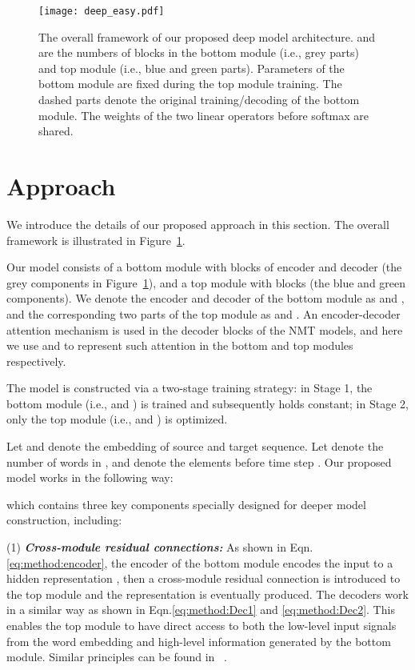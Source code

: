 \documentclass[11pt,a4paper]{article}
\begin{document}
\begin{figure}[!t]
\centering
\texttt{[image: deep\_easy.pdf]}
\caption{The overall framework of our proposed deep model architecture.  and  are the numbers of blocks in the bottom module (i.e., grey parts) and top module (i.e., blue and green parts). Parameters of the bottom module are fixed during the top module training. The dashed parts denote the original training/decoding of the bottom module. The weights of the two linear operators before softmax are shared.}
\label{fig:arch}
\end{figure}

\section{Approach}
\label{sec:approach}
We introduce the details of our proposed approach in this section. The overall framework is illustrated in Figure~\ref{fig:arch}. 

Our model consists of a bottom module with  blocks of encoder and decoder (the grey components in Figure~\ref{fig:arch}), and a top module with  blocks (the blue and green components). We denote the encoder and decoder of the bottom module as  and , and the corresponding two parts of the top module as  and . An encoder-decoder attention mechanism is used in the decoder blocks of the NMT models, and here we use  and  to represent such attention in the bottom and top modules respectively. 

The model is constructed via a two-stage training strategy: in Stage 1, the bottom module (i.e.,  and ) is trained and subsequently holds constant; in Stage 2,  only the top module (i.e.,  and ) is optimized. 

Let  and  denote the embedding of source and target sequence. Let  denote the number of words in , and  denote the elements before time step . Our proposed model works in the following way:

which contains three key components specially designed for deeper model construction, including:

\noindent(1) {\bf{\em Cross-module residual connections:}} As shown in Eqn.\eqref{eq:method:encoder}, the encoder  of the bottom module encodes the input  to a hidden representation , then a cross-module residual connection is introduced to the top module and the representation  is eventually produced. The decoders work in a similar way as shown in Eqn.\eqref{eq:method:Dec1} and \eqref{eq:method:Dec2}. This enables the top module to have direct access to both the low-level input signals from the word embedding and high-level information generated by the bottom module. Similar principles can be found in ~\citet{wang2017deep,wu2018word}.
\end{document}
